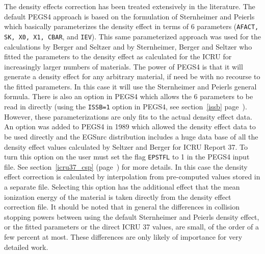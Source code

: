 The density effects correction
has been treated extensively in the literature.
The default PEGS4 approach is based on the formulation of Sternheimer and
Peierls\cite{SP71} which basically parameterizes the density effect in
terms of 6 parameters ({\tt AFACT, SK, X0, X1, CBAR}, and {\tt IEV}).  This same parameterized approach was used for
the calculations by Berger and Seltzer \cite{BS83} and by
Sternheimer, Berger and  Seltzer \cite{St82} who fitted the parameters to
the density effect as calculated for the ICRU for increasingly larger
numbers of materials.  The power of PEGS4 is that it will generate a
density effect for any arbitrary material, if need be with no recourse to the fitted
parameters. In this case it will use the  Sternheimer and
Peierls\cite{SP71} general formula.  There is also an option in PEGS4 which allows the 6
parameters to be read in directly (using the {\tt ISSB=1} option in PEGS4,
see section~\ref{issb} page~\pageref{issb}). However, these
parameterizations are only fits to the actual density effect data. An
option was added to PEGS4 in 1989 which allowed the density effect data
to be used directly\cite{Du89} and the EGSnrc distribution includes a huge
data base of all the density effect values calculated by Seltzer and Berger
for ICRU Report 37\cite{ICRU37}.
To turn this option on the user must
set the flag {\tt EPSTFL} to 1 in the PEGS4 input file. See
section~\ref{icru37_csp} (page~\pageref{icru37_csp}) for more details.
In this case the density effect correction is calculated
by interpolation from pre-computed values stored in
a separate file.
Selecting this option has the additional effect that the mean
ionization energy of the material is taken directly from
the density effect correction file. It should be noted that in general the
differences in collision stopping powers between using the default Sternheimer
and Peierls density effect, or the fitted parameters or the direct ICRU 37
values, are small, of the order of a few percent at most.  These
differences are only
likely of importance for very detailed work.

